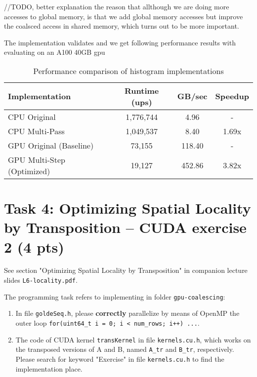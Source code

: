 \documentclass{article}
\begin{document}
//TODO, better explanation
the reason that allthough we are doing more accesses to global memory, 
is that we add global memory accesses but improve the coalsced access in shared memory, which turns out to be more important.

The implementation validates and we get following performance results with evaluating on an A100 40GB gpu

\begin{table}[h]
    \centering
    \begin{tabular}{|l|c|c|c|}
    \hline
    \textbf{Implementation} & \textbf{Runtime (ups)} & \textbf{GB/sec} & \textbf{Speedup} \\
    \hline
    CPU Original & 1,776,744 & 4.96 & - \\
    CPU Multi-Pass & 1,049,537 & 8.40 & 1.69x \\
    GPU Original (Baseline) & 73,155 & 118.40 & - \\
    GPU Multi-Step (Optimized) & 19,127 & 452.86 & 3.82x \\
    \hline
    \end{tabular}
    \caption{Performance comparison of histogram implementations}
    \label{tab:histogram-performance}
    \end{table}


\section{Task 4: Optimizing Spatial Locality by Transposition -- CUDA exercise 2 (4 pts)}

See section "Optimizing Spatial Locality by Transposition" in companion lecture slides \texttt{L6-locality.pdf}.

The programming task refers to implementing in folder \texttt{gpu-coalescing}: 

\begin{enumerate}
    \item In file \texttt{goldeSeq.h}, please \textbf{correctly} parallelize by means of OpenMP the outer loop \texttt{for(uint64\_t i = 0; i < num\_rows; i++) ...}. 

    \item The code of CUDA kernel \texttt{transKernel} in file \texttt{kernels.cu.h}, which works on the transposed versions of A and B, named \texttt{A\_tr} and \texttt{B\_tr}, respectively. Please search for keyword "Exercise" in file \texttt{kernels.cu.h} to find the implementation place.
\end{enumerate}
\end{document}
